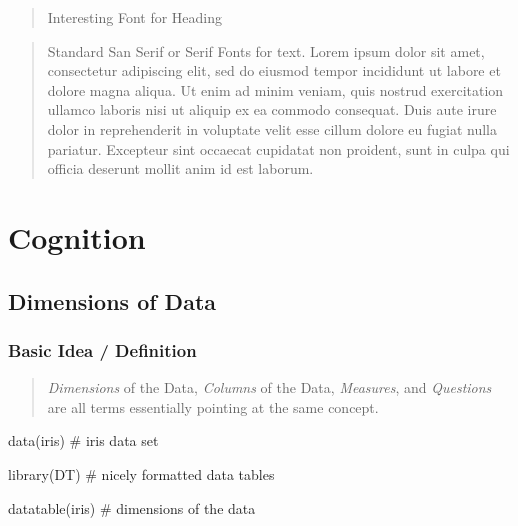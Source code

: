 \documentclass[
]{article}
\newenvironment{Shaded}{}{}
\newcommand{\CommentTok}[1]{\textcolor[rgb]{0.00,0.50,0.00}{#1}}
\newcommand{\FunctionTok}[1]{#1}
\newcommand{\NormalTok}[1]{#1}
\begin{document}
\begin{quote}
Interesting Font for Heading
\end{quote}

\begin{quote}
Standard San Serif or Serif Fonts for text. Lorem ipsum dolor sit amet,
consectetur adipiscing elit, sed do eiusmod tempor incididunt ut labore
et dolore magna aliqua. Ut enim ad minim veniam, quis nostrud
exercitation ullamco laboris nisi ut aliquip ex ea commodo consequat.
Duis aute irure dolor in reprehenderit in voluptate velit esse cillum
dolore eu fugiat nulla pariatur. Excepteur sint occaecat cupidatat non
proident, sunt in culpa qui officia deserunt mollit anim id est laborum.
\end{quote}

\hypertarget{cognition}{%
\section{Cognition}\label{cognition}}

\hypertarget{dimensions-of-data}{%
\subsection{Dimensions of Data}\label{dimensions-of-data}}

\hypertarget{basic-idea-definition}{%
\subsubsection{Basic Idea / Definition}\label{basic-idea-definition}}

\begin{quote}
\emph{Dimensions} of the Data, \emph{Columns} of the Data,
\emph{Measures}, and \emph{Questions} are all terms essentially pointing
at the same concept.
\end{quote}

\begin{Shaded}
\begin{Highlighting}[]
\FunctionTok{data}\NormalTok{(iris) }\CommentTok{\# iris data set}

\FunctionTok{library}\NormalTok{(DT) }\CommentTok{\# nicely formatted data tables}

\FunctionTok{datatable}\NormalTok{(iris) }\CommentTok{\# dimensions of the data}
\end{Highlighting}
\end{Shaded}
\end{document}
